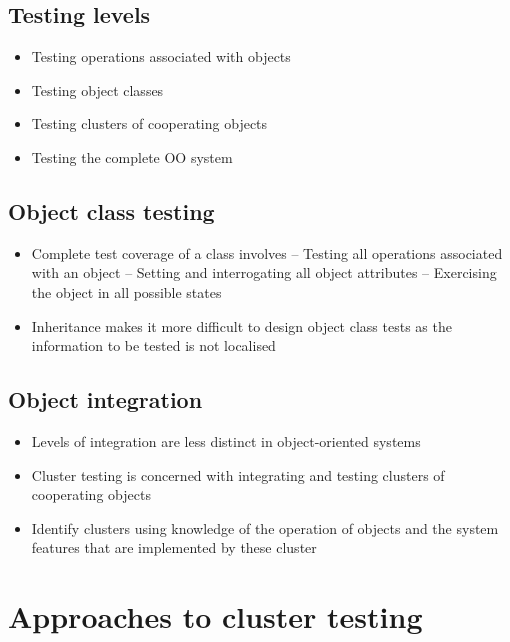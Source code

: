 \documentclass{article}
\begin{document}
\subsection{Testing levels}

\begin{itemize}
  \item Testing operations associated with objects 
  \item Testing object classes 
  \item Testing clusters of cooperating objects 
  \item Testing the complete OO system
\end{itemize}

\subsection{Object class testing}

\begin{itemize}
  \item Complete test coverage of a class involves – Testing all operations associated with an object – Setting and interrogating all object attributes – Exercising the object in all possible states 
  \item Inheritance makes it more difficult to design object class tests as the information to be tested is not localised
\end{itemize}

\subsection{Object integration}

\begin{itemize}
  \item Levels of integration are less distinct in object-oriented systems
  \item Cluster testing is concerned with integrating and testing clusters of cooperating objects
  \item Identify clusters using knowledge of the operation of objects and the system features that
are implemented by these cluster
\end{itemize}

\section{Approaches to cluster testing}
\end{document}
